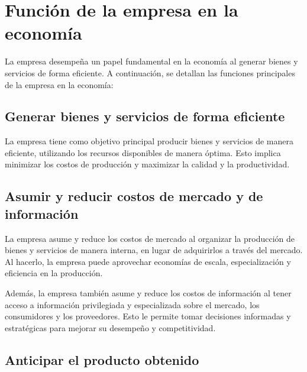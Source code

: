 \documentclass[
  a4paper,
]{article}
\begin{document}
\hypertarget{funciuxf3n-de-la-empresa-en-la-economuxeda}{%
\section{Función de la empresa en la
economía}\label{funciuxf3n-de-la-empresa-en-la-economuxeda}}

La empresa desempeña un papel fundamental en la economía al generar
bienes y servicios de forma eficiente. A continuación, se detallan las
funciones principales de la empresa en la economía:

\hypertarget{generar-bienes-y-servicios-de-forma-eficiente}{%
\subsection{Generar bienes y servicios de forma
eficiente}\label{generar-bienes-y-servicios-de-forma-eficiente}}

La empresa tiene como objetivo principal producir bienes y servicios de
manera eficiente, utilizando los recursos disponibles de manera óptima.
Esto implica minimizar los costos de producción y maximizar la calidad y
la productividad.

\hypertarget{asumir-y-reducir-costos-de-mercado-y-de-informaciuxf3n}{%
\subsection{Asumir y reducir costos de mercado y de
información}\label{asumir-y-reducir-costos-de-mercado-y-de-informaciuxf3n}}

La empresa asume y reduce los costos de mercado al organizar la
producción de bienes y servicios de manera interna, en lugar de
adquirirlos a través del mercado. Al hacerlo, la empresa puede
aprovechar economías de escala, especialización y eficiencia en la
producción.

Además, la empresa también asume y reduce los costos de información al
tener acceso a información privilegiada y especializada sobre el
mercado, los consumidores y los proveedores. Esto le permite tomar
decisiones informadas y estratégicas para mejorar su desempeño y
competitividad.

\hypertarget{anticipar-el-producto-obtenido}{%
\subsection{Anticipar el producto
obtenido}\label{anticipar-el-producto-obtenido}}
\end{document}

